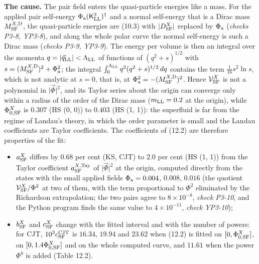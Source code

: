 \documentclass[
  10pt,
]{article}
\providecommand{\tightlist}{%
  \setlength{\itemsep}{0pt}\setlength{\parskip}{0pt}}
\begin{document}
\textbf{The cause.} The pair field enters the quasi-particle energies
like a mass. For the applied pair self-energy
\(\Phi_{\rm a}(\mathsf K^3_{\rm LL})^\dagger\) and a normal self-energy
that is a Dirac mass \(M^{X,{\rm D}}_{\rm SF}\), the quasi-particle
energies are (10.3) with \(\lvert D^X_{\rm SF}\rvert\) replaced by
\(\Phi_{\rm a}\) (\emph{checks P3-8, YP3-8}), and along the whole polar
curve the normal self-energy is such a Dirac mass (\emph{checks P3-9,
YP3-9}). The energy per volume is then an integral over the momenta
\(q=\lvert\vec q_{\rm LL}\rvert<\Lambda_{\rm LL}\) of functions of
\((q^2+s)^{1/2}\) with \(s=(M^{X,{\rm D}}_{\rm SF})^2+\Phi_{\rm a}^2\);
the integral \(\int_0^{\Lambda_{\rm LL}}q^2(q^2+s)^{1/2}\,dq\) contains
the term \(\tfrac1{16}s^2\ln s\), which is not analytic at \(s=0\), that
is, at \(\Phi_{\rm a}^2=-(M^{X,{\rm D}}_{\rm SF})^2\). Hence
\(\mathcal V^X_{\rm SF}\) is not a polynomial in
\(\lvert\vec\Phi\rvert^2\), and its Taylor series about the origin can
converge only within a radius of the order of the Dirac mass
(\(m_{\rm LL}=0.2\) at the origin), while \(\Phi^X_{0,{\rm SF}}\) is
\(0.307\) (HS (0, 0)) to \(0.403\) (HS (1, 1)): the superfluid is far
from the regime of Landau's theory, in which the order parameter is
small and the Landau coefficients are Taylor coefficients. The
coefficients of (12.2) are therefore properties of the fit:

\begin{itemize}
\tightlist
\item
  \(a^X_{\rm SF}\) differs by \(0.68\) per cent (KS, CJT) to \(2.0\) per
  cent (HS (1, 1)) from the Taylor coefficient
  \(a^{X,{\rm Tay}}_{\rm SF}\) of \(\lvert\vec\Phi\rvert^2\) at the
  origin, computed directly from the states with the small applied
  fields \(\Phi_{\rm a}=0.004\), \(0.008\), \(0.016\) (the quotient
  \(\mathcal V^X_{\rm SF}/\Phi^2\) at two of them, with the term
  proportional to \(\Phi^2\) eliminated by the Richardson extrapolation;
  the two pairs agree to \(8\times10^{-8}\), \emph{check P3-10}, and the
  Python program finds the same value to \(4\times10^{-11}\),
  \emph{check YP3-10});
\item
  \(b^X_{\rm SF}\) and \(c^X_{\rm SF}\) change with the fitted interval
  and with the number of powers: for CJT, \(10^3c^{\rm CJT}_{\rm SF}\)
  is \(16.34\), \(19.94\) and \(23.62\) when (12.2) is fitted on
  \([0,\Phi^X_{0,{\rm SF}}]\), on \([0,1.4\Phi^X_{0,{\rm SF}}]\) and on
  the whole computed curve, and \(11.61\) when the power \(\Phi^8\) is
  added (Table 12.2).
\end{itemize}
\end{document}
